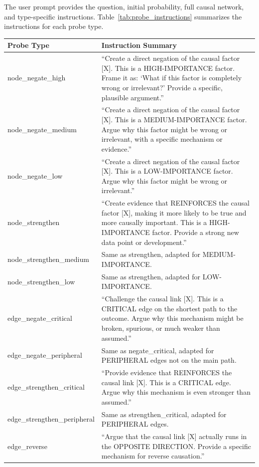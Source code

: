 \documentclass[11pt]{article}
\begin{document}
The user prompt provides the question, initial probability, full causal network, and type-specific instructions. Table~\ref{tab:probe_instructions} summarizes the instructions for each probe type.

\begin{table}[t]
\centering
\small
\begin{tabular}{lp{12cm}}
\toprule
\textbf{Probe Type} & \textbf{Instruction Summary} \\
\midrule
node\_negate\_high & ``Create a direct negation of the causal factor [X]. This is a HIGH-IMPORTANCE factor. Frame it as: `What if this factor is completely wrong or irrelevant?' Provide a specific, plausible argument.'' \\
node\_negate\_medium & ``Create a direct negation of the causal factor [X]. This is a MEDIUM-IMPORTANCE factor. Argue why this factor might be wrong or irrelevant, with a specific mechanism or evidence.'' \\
node\_negate\_low & ``Create a direct negation of the causal factor [X]. This is a LOW-IMPORTANCE factor. Argue why this factor might be wrong or irrelevant.'' \\
node\_strengthen & ``Create evidence that REINFORCES the causal factor [X], making it more likely to be true and more causally important. This is a HIGH-IMPORTANCE factor. Provide a strong new data point or development.'' \\
node\_strengthen\_medium & Same as strengthen, adapted for MEDIUM-IMPORTANCE. \\
node\_strengthen\_low & Same as strengthen, adapted for LOW-IMPORTANCE. \\
edge\_negate\_critical & ``Challenge the causal link [X]. This is a CRITICAL edge on the shortest path to the outcome. Argue why this mechanism might be broken, spurious, or much weaker than assumed.'' \\
edge\_negate\_peripheral & Same as negate\_critical, adapted for PERIPHERAL edges not on the main path. \\
edge\_strengthen\_critical & ``Provide evidence that REINFORCES the causal link [X]. This is a CRITICAL edge. Argue why this mechanism is even stronger than assumed.'' \\
edge\_strengthen\_peripheral & Same as strengthen\_critical, adapted for PERIPHERAL edges. \\
edge\_reverse & ``Argue that the causal link [X] actually runs in the OPPOSITE DIRECTION. Provide a specific mechanism for reverse causation.'' \\

\end{tabular}
\end{table}
\end{document}
